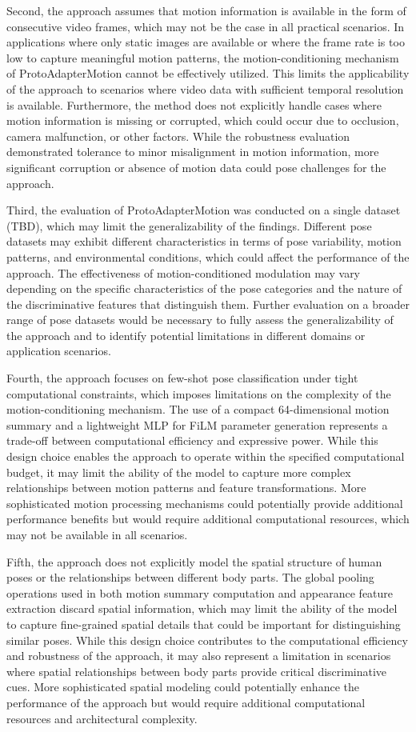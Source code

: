 \documentclass[11pt]{article}
\begin{document}
Second, the approach assumes that motion information is available in the form of consecutive video frames, which may not be the case in all practical scenarios. In applications where only static images are available or where the frame rate is too low to capture meaningful motion patterns, the motion-conditioning mechanism of ProtoAdapterMotion cannot be effectively utilized. This limits the applicability of the approach to scenarios where video data with sufficient temporal resolution is available. Furthermore, the method does not explicitly handle cases where motion information is missing or corrupted, which could occur due to occlusion, camera malfunction, or other factors. While the robustness evaluation demonstrated tolerance to minor misalignment in motion information, more significant corruption or absence of motion data could pose challenges for the approach.

Third, the evaluation of ProtoAdapterMotion was conducted on a single dataset (TBD), which may limit the generalizability of the findings. Different pose datasets may exhibit different characteristics in terms of pose variability, motion patterns, and environmental conditions, which could affect the performance of the approach. The effectiveness of motion-conditioned modulation may vary depending on the specific characteristics of the pose categories and the nature of the discriminative features that distinguish them. Further evaluation on a broader range of pose datasets would be necessary to fully assess the generalizability of the approach and to identify potential limitations in different domains or application scenarios.

Fourth, the approach focuses on few-shot pose classification under tight computational constraints, which imposes limitations on the complexity of the motion-conditioning mechanism. The use of a compact 64-dimensional motion summary and a lightweight MLP for FiLM parameter generation represents a trade-off between computational efficiency and expressive power. While this design choice enables the approach to operate within the specified computational budget, it may limit the ability of the model to capture more complex relationships between motion patterns and feature transformations. More sophisticated motion processing mechanisms could potentially provide additional performance benefits but would require additional computational resources, which may not be available in all scenarios.

Fifth, the approach does not explicitly model the spatial structure of human poses or the relationships between different body parts. The global pooling operations used in both motion summary computation and appearance feature extraction discard spatial information, which may limit the ability of the model to capture fine-grained spatial details that could be important for distinguishing similar poses. While this design choice contributes to the computational efficiency and robustness of the approach, it may also represent a limitation in scenarios where spatial relationships between body parts provide critical discriminative cues. More sophisticated spatial modeling could potentially enhance the performance of the approach but would require additional computational resources and architectural complexity.
\end{document}
